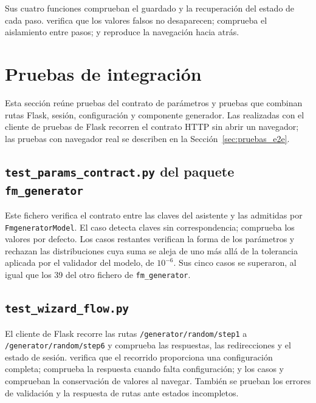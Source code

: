 Sus cuatro funciones comprueban el guardado y la recuperación del estado de
cada paso. 
verifica que los valores falsos no desaparecen;
comprueba el aislamiento entre pasos; y
reproduce la navegación hacia atrás.

\section{Pruebas de integración}
\label{sec:pruebas_integracion}


Esta sección reúne pruebas del contrato de parámetros y pruebas que combinan
rutas Flask, sesión, configuración y componente generador. Las realizadas con
el cliente de pruebas de Flask recorren el contrato HTTP sin abrir un
navegador; las pruebas con navegador real se describen en la
Sección~\ref{sec:pruebas_e2e}.

\subsection{\texttt{test\_params\_contract.py} del paquete \texttt{fm\_generator}}

Este fichero verifica el contrato entre las claves del asistente y las
admitidas por \texttt{FmgeneratorModel}. El caso
detecta claves sin correspondencia;
comprueba los valores por defecto. Los casos restantes verifican la forma de los parámetros y rechazan las
distribuciones cuya suma se aleja de uno más allá de la tolerancia aplicada
por el validador del modelo, de $10^{-6}$. Sus cinco casos
se superaron, al igual que los 39 del otro fichero de \texttt{fm\_generator}.

\subsection{\texttt{test\_wizard\_flow.py}}

El cliente de Flask recorre las rutas \texttt{/generator/random/step1} a
\texttt{/generator/random/step6} y comprueba las respuestas, las redirecciones
y el estado de sesión. 
verifica que el recorrido proporciona una configuración completa;
 comprueba la
respuesta cuando falta configuración; y los casos
 y
comprueban la conservación de valores al navegar. También se prueban los
errores de validación y la respuesta de rutas ante estados incompletos.

